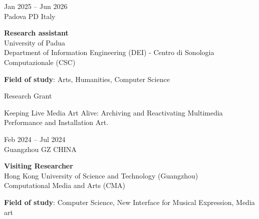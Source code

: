 \documentclass[7pt,a4paper]{article}
\begin{document}
\begin{mdframed}[
    backgroundcolor=white,
    linecolor=white,
    linewidth=0pt,
    innerleftmargin=6pt,
    innerrightmargin=6pt,
    innertopmargin=6pt,
    innerbottommargin=6pt,
    skipabove=0pt,
    skipbelow=0pt
]

\begin{minipage}[t]{0.28\textwidth}

Jan 2025 – Jun 2026
\\\scriptsize Padova PD Italy

\end{minipage}
\begin{minipage}[t]{0.68\textwidth}
\normalsize
\textbf{Research assistant}\\
University of Padua
\\ \small Department of Information Engineering (DEI) - Centro di Sonologia Computazionale (CSC)
\par \vspace{0.1cm} 

\par \scriptsize \textbf{Field of study}: Arts, Humanities, Computer Science
 

\scriptsize Research Grant

\scriptsize Keeping Live Media Art Alive: Archiving and Reactivating Multimedia Performance and Installation Art.

\end{minipage}
\vspace{0.25cm}
\end{mdframed}


\begin{mdframed}[
    backgroundcolor=entrygray,
    linecolor=entrygray,
    linewidth=0pt,
    innerleftmargin=6pt,
    innerrightmargin=6pt,
    innertopmargin=6pt,
    innerbottommargin=6pt,
    skipabove=0pt,
    skipbelow=0pt
]

\begin{minipage}[t]{0.28\textwidth}

Feb 2024 – Jul 2024
\\\scriptsize Guangzhou GZ CHINA

\end{minipage}
\begin{minipage}[t]{0.68\textwidth}
\normalsize
\textbf{Visiting Researcher}\\
Hong Kong University of Science and Technology (Guangzhou)
\\ \small Computational Media and Arts (CMA)
\par \vspace{0.1cm} 

\par \scriptsize \textbf{Field of study}: Computer Science, New Interface for Musical Expression, Media art
 

\end{minipage}
\vspace{0.25cm}
\end{mdframed}
\end{document}
